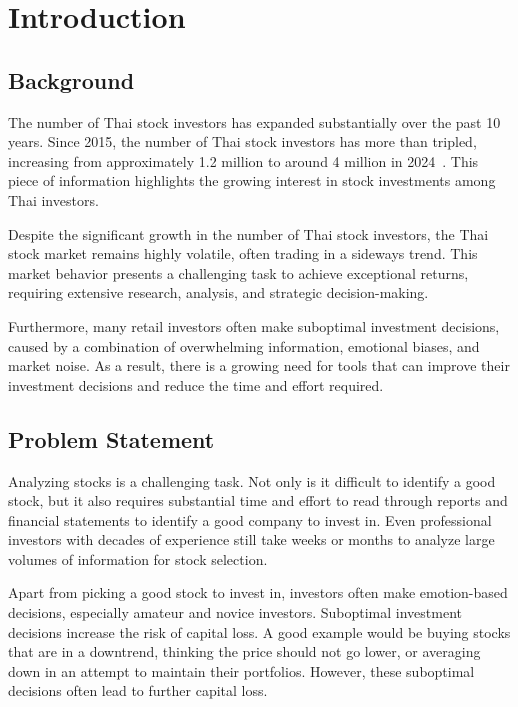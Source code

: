 \chapter{Introduction}
\label{chap:introduction}

\section{Background}
\label{section:background}

The number of Thai stock investors has expanded substantially over the past 10 years.
Since 2015, the number of Thai stock investors has more than tripled, increasing from
approximately 1.2 million to around 4 million in 2024~\cite{SETStatistics2024}.
This piece of information highlights the growing interest in stock investments among Thai investors.

Despite the significant growth in the number of Thai stock investors, the Thai stock market remains highly volatile,
often trading in a sideways trend. This market behavior presents a challenging task to achieve exceptional returns,
requiring extensive research, analysis, and strategic decision-making.

Furthermore, many retail investors often make suboptimal investment decisions, caused by a combination of
overwhelming information, emotional biases, and market noise. As a result, there is a growing need for tools that can
improve their investment decisions and reduce the time and effort required.

\section{Problem Statement}
\label{section:problem-statement}

Analyzing stocks is a challenging task. Not only is it difficult to identify a good stock, but it also requires substantial time and effort
to read through reports and financial statements to identify a good company to invest in. Even professional investors with decades of experience
still take weeks or months to analyze large volumes of information for stock selection.

Apart from picking a good stock to invest in, investors often make emotion-based decisions, especially amateur and novice investors.
Suboptimal investment decisions increase the risk of capital loss. A good example would be buying stocks that are in a downtrend, thinking the
price should not go lower, or averaging down in an attempt to maintain their portfolios. However, these suboptimal decisions often lead to
further capital loss.

